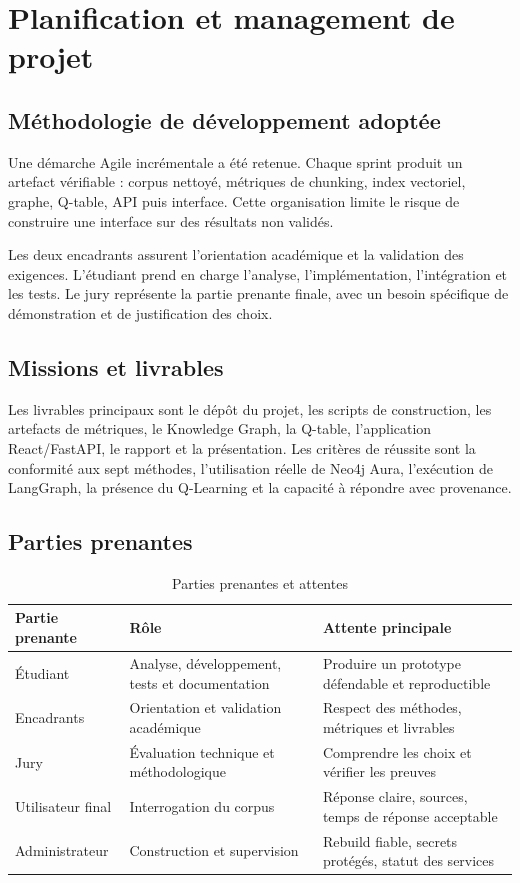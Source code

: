 \documentclass[12pt,a4paper,oneside]{report}
\begin{document}
\section{Planification et management de projet}
\subsection{Méthodologie de développement adoptée}
Une démarche Agile incrémentale a été retenue. Chaque sprint produit un artefact vérifiable : corpus nettoyé, métriques de chunking, index vectoriel, graphe, Q-table, API puis interface. Cette organisation limite le risque de construire une interface sur des résultats non validés.

Les deux encadrants assurent l'orientation académique et la validation des exigences. L'étudiant prend en charge l'analyse, l'implémentation, l'intégration et les tests. Le jury représente la partie prenante finale, avec un besoin spécifique de démonstration et de justification des choix.

\subsection{Missions et livrables}
Les livrables principaux sont le dépôt du projet, les scripts de construction, les artefacts de métriques, le Knowledge Graph, la Q-table, l'application React/FastAPI, le rapport et la présentation. Les critères de réussite sont la conformité aux sept méthodes, l'utilisation réelle de Neo4j Aura, l'exécution de LangGraph, la présence du Q-Learning et la capacité à répondre avec provenance.

\subsection{Parties prenantes}
\begin{table}[H]
\centering
\caption{Parties prenantes et attentes}
\begin{tabularx}{\textwidth}{p{}p{}X}
\toprule
\textbf{Partie prenante} & \textbf{Rôle} & \textbf{Attente principale}\\
\midrule
Étudiant & Analyse, développement, tests et documentation & Produire un prototype défendable et reproductible\\
Encadrants & Orientation et validation académique & Respect des méthodes, métriques et livrables\\
Jury & Évaluation technique et méthodologique & Comprendre les choix et vérifier les preuves\\
Utilisateur final & Interrogation du corpus & Réponse claire, sources, temps de réponse acceptable\\
Administrateur & Construction et supervision & Rebuild fiable, secrets protégés, statut des services\\
\bottomrule
\end{tabularx}
\end{table}
\end{document}
